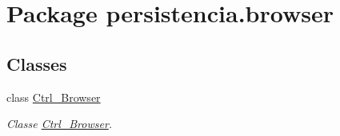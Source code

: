 \hypertarget{namespacepersistencia_1_1browser}{}\section{Package persistencia.\+browser}
\label{namespacepersistencia_1_1browser}
\subsection*{Classes}
\begin{DoxyCompactItemize}
\item 
class \hyperlink{classpersistencia_1_1browser_1_1Ctrl__Browser}{Ctrl\+\_\+\+Browser}
\begin{DoxyCompactList}\small\item\em Classe \hyperlink{classpersistencia_1_1browser_1_1Ctrl__Browser}{Ctrl\+\_\+\+Browser}. \end{DoxyCompactList}\end{DoxyCompactItemize}
